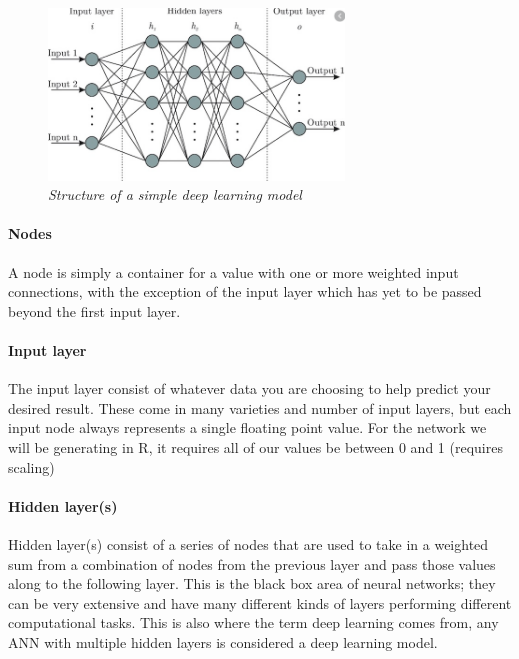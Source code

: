 \documentclass[
]{article}
\begin{document}
\begin{figure}
\centering
\includegraphics[width=0.7\textwidth,height=\textheight]{media/neuralNetDiagram.png}
\caption{\emph{Structure of a simple deep learning model}}
\end{figure}

\hypertarget{nodes}{%
\paragraph{Nodes}\label{nodes}}

A node is simply a container for a value with one or more weighted input
connections, with the exception of the input layer which has yet to be
passed beyond the first input layer.

\hypertarget{input-layer}{%
\paragraph{Input layer}\label{input-layer}}

The input layer consist of whatever data you are choosing to help
predict your desired result. These come in many varieties and number of
input layers, but each input node always represents a single floating
point value. For the network we will be generating in R, it requires all
of our values be between 0 and 1 (requires scaling)

\hypertarget{hidden-layers}{%
\paragraph{Hidden layer(s)}\label{hidden-layers}}

Hidden layer(s) consist of a series of nodes that are used to take in a
weighted sum from a combination of nodes from the previous layer and
pass those values along to the following layer. This is the black box
area of neural networks; they can be very extensive and have many
different kinds of layers performing different computational tasks. This
is also where the term deep learning comes from, any ANN with multiple
hidden layers is considered a deep learning model.
\end{document}

